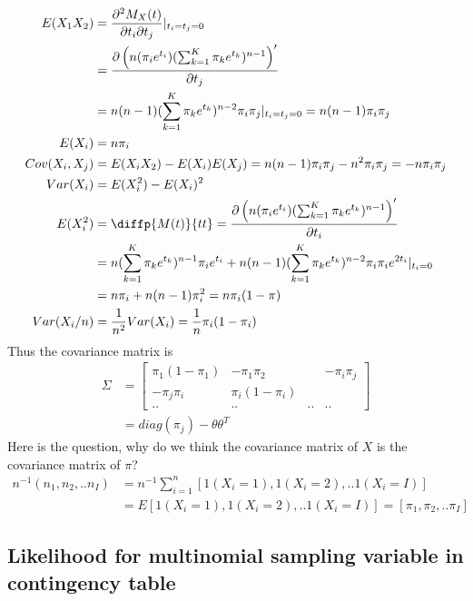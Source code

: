 \documentclass[11pt]{article} %
\begin{document}
	\begin{align*}
		E(X_1 X_2) &= \frac{\partial^2 M_X(t)}{\partial t_i \partial t_j}|_{t_i = t_j = 0}\\
		&= \frac{\partial \left(n(\pi_ie^{t_i})(\sum_{k=1}^K \pi_ke^{t_k})^{n-1} \right)'}{\partial t_j}\\
		&= n(n-1)(\sum_{k=1}^K \pi_ke^{t_k})^{n-2}\pi_i\pi_j|_{t_i = t_j = 0} = n(n-1)\pi_i\pi_j\\
		E(X_i) &= n\pi_i\\
		Cov(X_i, X_j) &= E(X_i X_2) - E(X_i)E(X_j) = n(n-1)\pi_i\pi_j - n^2 \pi_i\pi_j = -n\pi_i\pi_j\\
		Var(X_i) &= E(X_i^2) - E(X_i)^2 \\
		E(X_i^2) &= \diffp{M(t)}{t t} = \frac{\partial \left(n(\pi_ie^{t_i})(\sum_{k=1}^K \pi_ke^{t_k})^{n-1} \right)'}{\partial t_i}\\
		&= n(\sum_{k=1}^K \pi_ke^{t_k})^{n-1}\pi_i e^{t_i}+ n(n-1)(\sum_{k=1}^K \pi_ke^{t_k})^{n-2}\pi_i\pi_i e^{2t_i}|_{t_i = 0} \\
		&= n\pi_i + n(n-1)\pi_i^2 = n\pi_i(1-\pi)\\
		Var(X_i/n) &= \frac{1}{n^2} Var(X_i) = \frac{1}{n}\pi_i(1-\pi_i)
	\end{align*}
	Thus the covariance matrix is
	\begin{align*}
		\Sigma &= \begin{bmatrix}
			\pi_1(1-\pi_1) &  -\pi_1\pi_2&  & -\pi_i\pi_j \\
			-\pi_j\pi_i&  \pi_i(1-\pi_i)&   &  \\
			..& ..&..&..
		\end{bmatrix}\\
		&= diag{(\pi_j) - \theta \theta^T}
	\end{align*}
	Here is the question, why do we think the covariance matrix of $X$ is the covariance matrix of $\pi$?
	\begin{align*}
		n^{-1} (n_1, n_2, ..n_I) &= n^{-1} \sum_{i=1}^n[ 1 (X_{i}=1), 1 (X_{i}=2), ..1 (X_{i}=I)] \\
		&= E[1 (X_{i}=1), 1 (X_{i}=2), ..1 (X_{i}=I) ] = [\pi_1, \pi_2, .. \pi_I] 
	\end{align*}
	\subsection{Likelihood for multinomial sampling variable in contingency table}
	
\end{document}
